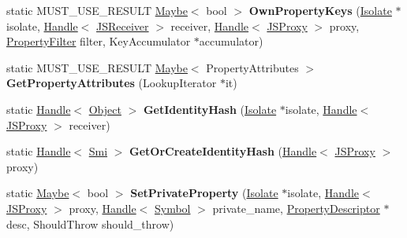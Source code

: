 \begin{DoxyCompactItemize}
\item 
static M\+U\+S\+T\+\_\+\+U\+S\+E\+\_\+\+R\+E\+S\+U\+LT \hyperlink{classv8_1_1_maybe}{Maybe}$<$ bool $>$ {\bfseries Own\+Property\+Keys} (\hyperlink{classv8_1_1internal_1_1_isolate}{Isolate} $\ast$isolate, \hyperlink{classv8_1_1internal_1_1_handle}{Handle}$<$ \hyperlink{classv8_1_1internal_1_1_j_s_receiver}{J\+S\+Receiver} $>$ receiver, \hyperlink{classv8_1_1internal_1_1_handle}{Handle}$<$ \hyperlink{classv8_1_1internal_1_1_j_s_proxy}{J\+S\+Proxy} $>$ proxy, \hyperlink{namespacev8_afbf02b6b1152a3e25d7bde90798209ac}{Property\+Filter} filter, Key\+Accumulator $\ast$accumulator)\hypertarget{classv8_1_1internal_1_1_j_s_proxy_a8044167565b31c198fbab688940c14f8}{}\label{classv8_1_1internal_1_1_j_s_proxy_a8044167565b31c198fbab688940c14f8}

\item 
static M\+U\+S\+T\+\_\+\+U\+S\+E\+\_\+\+R\+E\+S\+U\+LT \hyperlink{classv8_1_1_maybe}{Maybe}$<$ Property\+Attributes $>$ {\bfseries Get\+Property\+Attributes} (Lookup\+Iterator $\ast$it)\hypertarget{classv8_1_1internal_1_1_j_s_proxy_af1bde8c5e31f6829fb57e509bd979a22}{}\label{classv8_1_1internal_1_1_j_s_proxy_af1bde8c5e31f6829fb57e509bd979a22}

\item 
static \hyperlink{classv8_1_1internal_1_1_handle}{Handle}$<$ \hyperlink{classv8_1_1internal_1_1_object}{Object} $>$ {\bfseries Get\+Identity\+Hash} (\hyperlink{classv8_1_1internal_1_1_isolate}{Isolate} $\ast$isolate, \hyperlink{classv8_1_1internal_1_1_handle}{Handle}$<$ \hyperlink{classv8_1_1internal_1_1_j_s_proxy}{J\+S\+Proxy} $>$ receiver)\hypertarget{classv8_1_1internal_1_1_j_s_proxy_ac77873d59ccad5fe5b6b9e2c3ca72b00}{}\label{classv8_1_1internal_1_1_j_s_proxy_ac77873d59ccad5fe5b6b9e2c3ca72b00}

\item 
static \hyperlink{classv8_1_1internal_1_1_handle}{Handle}$<$ \hyperlink{classv8_1_1internal_1_1_smi}{Smi} $>$ {\bfseries Get\+Or\+Create\+Identity\+Hash} (\hyperlink{classv8_1_1internal_1_1_handle}{Handle}$<$ \hyperlink{classv8_1_1internal_1_1_j_s_proxy}{J\+S\+Proxy} $>$ proxy)\hypertarget{classv8_1_1internal_1_1_j_s_proxy_a63c872b59e59a2fd31f559cf28c570f1}{}\label{classv8_1_1internal_1_1_j_s_proxy_a63c872b59e59a2fd31f559cf28c570f1}

\item 
static \hyperlink{classv8_1_1_maybe}{Maybe}$<$ bool $>$ {\bfseries Set\+Private\+Property} (\hyperlink{classv8_1_1internal_1_1_isolate}{Isolate} $\ast$isolate, \hyperlink{classv8_1_1internal_1_1_handle}{Handle}$<$ \hyperlink{classv8_1_1internal_1_1_j_s_proxy}{J\+S\+Proxy} $>$ proxy, \hyperlink{classv8_1_1internal_1_1_handle}{Handle}$<$ \hyperlink{classv8_1_1internal_1_1_symbol}{Symbol} $>$ private\+\_\+name, \hyperlink{classv8_1_1internal_1_1_property_descriptor}{Property\+Descriptor} $\ast$desc, Should\+Throw should\+\_\+throw)\hypertarget{classv8_1_1internal_1_1_j_s_proxy_adb692ec35500583b425e8f0d7fafa9b0}{}\label{classv8_1_1internal_1_1_j_s_proxy_adb692ec35500583b425e8f0d7fafa9b0}

\end{DoxyCompactItemize}
